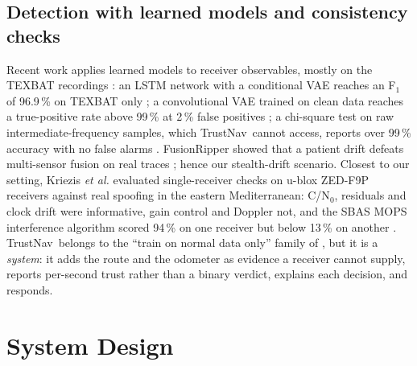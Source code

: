 \documentclass[conference]{IEEEtran}
\newcommand{\sys}{TrustNav}
\begin{document}
\subsection{Detection with learned models and consistency checks}
Recent work applies learned models to receiver observables, mostly on the TEXBAT recordings \cite{texbat}: an LSTM network with a conditional VAE reaches an F$_1$ of 96.9\,\% on TEXBAT only \cite{tang2025}; a convolutional VAE trained on clean data reaches a true-positive rate above 99\,\% at 2\,\% false positives \cite{iqbal2025}; a chi-square test on raw intermediate-frequency samples, which \sys\ cannot access, reports over 99\,\% accuracy with no false alarms \cite{bhuiyan2026}. FusionRipper showed that a patient drift defeats multi-sensor fusion on real traces \cite{shen2020}; hence our stealth-drift scenario. Closest to our setting, Kriezis \emph{et al.} evaluated single-receiver checks on  u-blox ZED-F9P receivers against real spoofing in the eastern Mediterranean: C/N$_0$, residuals and clock drift were informative, gain control and Doppler not, and the SBAS MOPS interference algorithm scored 94\,\% on one receiver but below 13\,\% on another \cite{kriezis2025}. \sys\ belongs to the ``train on normal data only'' family of \cite{iqbal2025}, but it is a \emph{system}: it adds the route and the odometer as evidence a receiver cannot supply, reports per-second trust rather than a binary verdict, explains each decision, and responds.

\section{System Design}\label{sec:design}
\end{document}
